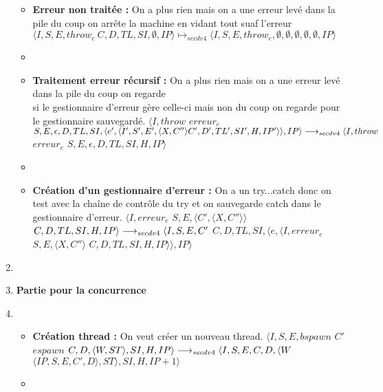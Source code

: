 \documentclass[10pt,a4paper]{article}
\begin{document}
\begin{enumerate}
\begin{itemize}
						\item[]  \textbf{Erreur non traitée :} On a plus rien mais on a une erreur levé dans la pile du coup on arrête la machine en vidant tout suaf l'erreur
						\smallbreak 
						$\langle I,S,E,throw_{e}~C,D,TL,SI,\emptyset,IP\rangle \longmapsto_{secdv4} \langle I,S,E,throw_{e},\emptyset,\emptyset,\emptyset,\emptyset,\emptyset,IP\rangle$  
						\item[]
						
						\item[]  \textbf{Traitement erreur récursif :} On a plus rien mais on a une erreur levé dans la pile du coup on regarde 
						\\si le gestionnaire d'erreur gère celle-ci mais non du coup on regarde pour le gestionnaire sauvegardé.
						\smallbreak 
						$\langle I,throw$ $erreur_{e}$ $S,E,\epsilon,D,TL,SI,\langle e',\langle I',S',E',\langle X,C'' \rangle C',D',TL',SI',H,IP'\rangle\rangle,IP\rangle \\\longrightarrow_{secdv4}\langle I,throw$ $erreur_{e}$ $S,E,\epsilon,D,TL,SI,H,IP\rangle$
						\item[]  \newpage
						
						
						
						\item[]  \textbf{Création d'un gestionnaire d'erreur :} On a un try...catch donc on test avec la chaîne de contrôle du try et on sauvegarde catch dans le gestionnaire d'erreur.
						\smallbreak 
						$\langle I,erreur_{e}$ $S,E,\langle C',\langle X,C''\rangle\rangle$ $C,D,TL,SI,H,IP\rangle 
						\\\longrightarrow_{secdv4} \langle I,S,E,C'$ $C,D,TL,SI,\langle e,\langle I,erreur_{e}$ $S,E,\langle X,C'' \rangle$ $C,D,TL,SI,H,IP\rangle\rangle,IP\rangle$
					\end{itemize}
					\item[]
					\item[] \textbf{Partie pour la concurrence} 
					\item[]
					\begin{itemize}
						\item[]  \textbf{Création thread :} On veut créer un nouveau thread.
						\smallbreak 
						$\langle I,S,E,bspawn$ $C'$ $espawn$ $C,D,\langle W,ST\rangle,SI,H,IP\rangle 
						\\\longrightarrow_{secdv4} \langle I,S,E,C,D,\langle W$ $\langle IP,S,E,C',D\rangle,ST\rangle,SI,H,IP+1\rangle$
						\item[]
							

\end{itemize}
\end{enumerate}
\end{document}
